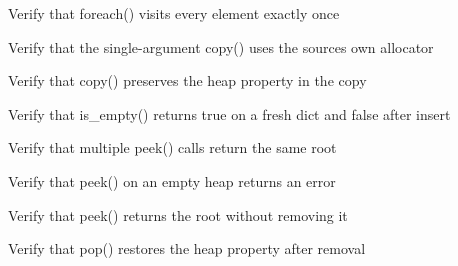 \begin{DoxyRefList}
%
Verify that foreach() visits every element exactly once  
\item[Global \doxylink{test__heap_8cpp_a96dd9ac52947dd6281bc2ccf78caefaf}{TEST\+\_\+F} (\doxylink{classHeapMinTest}{Heap\+Min\+Test}, Copy\+One\+Arg\+Overload\+Succeeds)]\label{test__test000292}%
%
Verify that the single-\/argument copy() uses the source\textquotesingle{}s own allocator  
\item[Global \doxylink{test__heap_8cpp_a721c28a5cf016e10cef4a92f78a48e75}{TEST\+\_\+F} (\doxylink{classHeapMinTest}{Heap\+Min\+Test}, Copy\+Preserves\+Heap\+Property)]\label{test__test000291}%
%
Verify that copy() preserves the heap property in the copy  
\item[Global \doxylink{test__dict_8cpp_aa3b550761f1e30f2c77c74934fdc6a06}{TEST\+\_\+F} (\doxylink{classDictTest}{Dict\+Test}, Is\+Empty\+Fresh\+And\+After\+Insert)]\label{test__test000262}%
%
Verify that is\+\_\+empty() returns true on a fresh dict and false after insert  
\item[Global \doxylink{test__heap_8cpp_afc8061cfc61e40cf787235e31d8762a1}{TEST\+\_\+F} (\doxylink{classHeapMinTest}{Heap\+Min\+Test}, Multiple\+Consecutive\+Peeks\+Return\+Same\+Root)]\label{test__test000289}%
%
Verify that multiple peek() calls return the same root  
\item[Global \doxylink{test__heap_8cpp_a535e0a31be7232410e918507c5f18f99}{TEST\+\_\+F} (\doxylink{classHeapMinTest}{Heap\+Min\+Test}, Peek\+Empty\+Heap\+Returns\+Error)]\label{test__test000288}%
%
Verify that peek() on an empty heap returns an error  
\item[Global \doxylink{test__heap_8cpp_abe7579bde35aec7440cda4320d326a32}{TEST\+\_\+F} (\doxylink{classHeapMinTest}{Heap\+Min\+Test}, Peek\+Returns\+Root\+Without\+Removing)]\label{test__test000287}%
%
Verify that peek() returns the root without removing it  
\item[Global \doxylink{test__heap_8cpp_a9f06eb2865355574c67fc596f3f07431}{TEST\+\_\+F} (\doxylink{classHeapMinTest}{Heap\+Min\+Test}, Pop\+Restores\+Heap\+Property)]\label{test__test000286}%
%
Verify that pop() restores the heap property after removal  
\item[Global \doxylink{test__heap_8cpp_a31e2105825e12e354ec9e68c9e960201}{TEST\+\_\+F} (\doxylink{classHeapMaxTest}{Heap\+Max\+Test}, Successive\+Pops\+Return\+Descending\+Order)]\label{test__test000285}%

\end{DoxyRefList}
